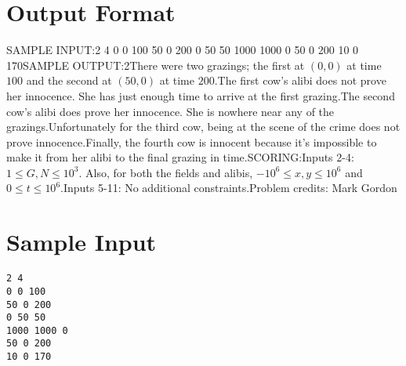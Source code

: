 \documentclass[12pt]{article}
\begin{document}
\section*{Output Format}
SAMPLE INPUT:2 4
0 0 100
50 0 200
0 50 50
1000 1000 0
50 0 200
10 0 170SAMPLE OUTPUT:2There were two grazings; the first at $(0, 0)$ at time $100$ and the
second at $(50, 0)$ at time $200$.The first cow's alibi does not prove her innocence.  She has just enough time to
arrive at the first grazing.The second cow's alibi does prove her innocence.  She is nowhere near any of the
grazings.Unfortunately for the third cow, being at the scene of the crime does not prove
innocence.Finally, the fourth cow is innocent because it's impossible to make it from her
alibi to the final grazing in time.SCORING:Inputs 2-4: $1 \le G, N \le 10^3$. Also, for both the fields and alibis,
$-10^6 \le x, y \le 10^6$ and  $0 \le t \le 10^6$.Inputs 5-11: No additional constraints.Problem credits: Mark Gordon

\section*{Sample Input}
\begin{verbatim}
2 4
0 0 100
50 0 200
0 50 50
1000 1000 0
50 0 200
10 0 170
\end{verbatim}
\end{document}
